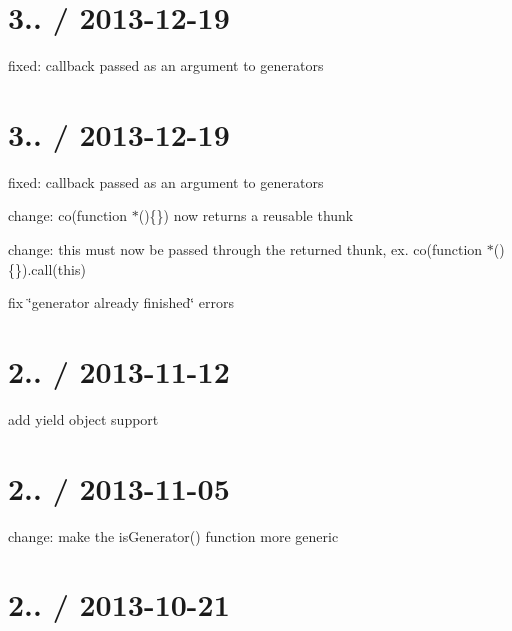 \section*{3.. / 2013-\/12-\/19 }


\begin{DoxyItemize}
\item fixed\+: callback passed as an argument to generators
\end{DoxyItemize}

\section*{3.. / 2013-\/12-\/19 }


\begin{DoxyItemize}
\item fixed\+: callback passed as an argument to generators
\item change\+: {\ttfamily co(function $\ast$()\{\})} now returns a reusable thunk
\item change\+: {\ttfamily this} must now be passed through the returned thunk, ex. {\ttfamily co(function $\ast$()\{\}).call(this)}
\item fix \char`\"{}generator already finished\char`\"{} errors
\end{DoxyItemize}

\section*{2.. / 2013-\/11-\/12 }


\begin{DoxyItemize}
\item add {\ttfamily yield object} support
\end{DoxyItemize}

\section*{2.. / 2013-\/11-\/05 }


\begin{DoxyItemize}
\item change\+: make the {\ttfamily is\+Generator()} function more generic
\end{DoxyItemize}

\section*{2.. / 2013-\/10-\/21 }



